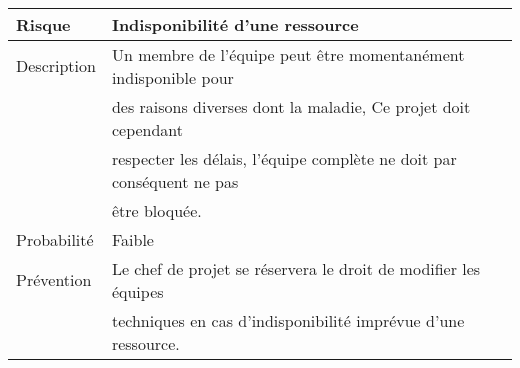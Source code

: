 \\
\\~
\\ 
\begin{tabular}{|l|l|}
\hline Risque & Indisponibilité d'une ressource \\ \hline
Description & Un membre de l'équipe peut être momentanément indisponible pour \\
& des raisons diverses dont la maladie, Ce projet doit cependant \\
& respecter les délais, l'équipe complète ne doit par conséquent  ne pas \\
& être bloquée. \\ \hline
Probabilité & Faible \\ \hline
Prévention & Le chef de projet se réservera le droit de modifier les équipes \\
& techniques en cas d'indisponibilité imprévue d'une ressource. \\ \hline 
\end{tabular}
